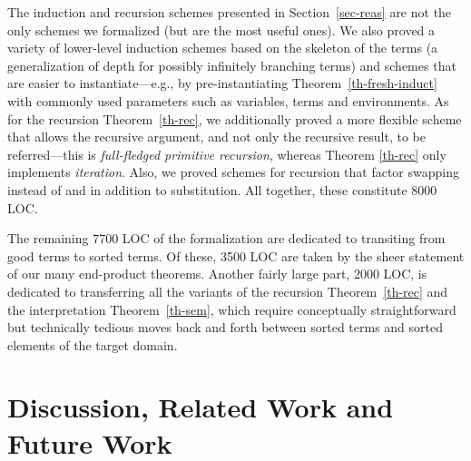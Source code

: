 \documentclass{llncs}
\begin{document}
The induction and recursion schemes presented in Section~\ref{sec-reas} are  
not the only schemes we formalized (but are the most useful ones). 
We also proved a variety of lower-level induction schemes 
based on the skeleton of the terms (a generalization of depth for possibly infinitely branching terms) 
and schemes that are easier to instantiate---e.g., by pre-instantiating Theorem~\ref{th-fresh-induct}   
with commonly used parameters such as variables, terms and environments. 
As for the recursion Theorem~\ref{th-rec}, we additionally proved a more flexible scheme that allows 
the recursive argument, and not only the recursive result, to be referred---this is 
{\em full-fledged primitive recursion}, whereas Theorem \ref{th-rec} only implements {\em iteration}. 
%
Also, we proved schemes for recursion that factor swapping \cite{norrish-MechanisingLambdaInFirstOrder} 
instead of and in addition to substitution. %
All together, these constitute 8000 LOC. %

The remaining 7700 LOC of the formalization are dedicated to transiting from good terms 
to sorted terms. Of these, 3500 LOC are taken by the sheer statement 
of our many end-product theorems. Another fairly large part, 2000 LOC, is dedicated to 
transferring all the variants of the recursion 
Theorem~\ref{th-rec} and the interpretation Theorem~\ref{th-sem}, which require conceptually straightforward
but technically tedious moves back and forth 
between sorted terms and sorted elements of the target domain.   












\section{Discussion,  
Related Work and Future Work} \label{sec-RelWork} 
\end{document}
